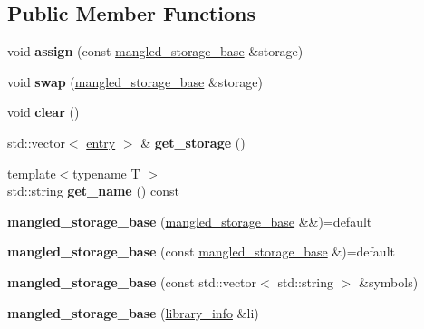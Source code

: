 \subsection*{Public Member Functions}
\begin{DoxyCompactItemize}
\item 
\mbox{\label{a01380_ac4989f636dfa95e4227246011e78c3cf}} 
void {\bfseries assign} (const \hyperlink{a01380}{mangled\+\_\+storage\+\_\+base} \&storage)
\item 
\mbox{\label{a01380_a70f98c02298a3beee142579612d5c3af}} 
void {\bfseries swap} (\hyperlink{a01380}{mangled\+\_\+storage\+\_\+base} \&storage)
\item 
\mbox{\label{a01380_a3bfdf5084f6b0bfcaf41c4d05d2fc7af}} 
void {\bfseries clear} ()
\item 
\mbox{\label{a01380_af90d143d8d8a55650fd50fba1d173cbf}} 
std\+::vector$<$ \hyperlink{a01384}{entry} $>$ \& {\bfseries get\+\_\+storage} ()
\item 
\mbox{\label{a01380_afcd7be4adc52c9699ca4dbe92cc5209f}} 
{\footnotesize template$<$typename T $>$ }\\std\+::string {\bfseries get\+\_\+name} () const
\item 
\mbox{\label{a01380_ac8061dc543e120d34db0915d8f257f1b}} 
{\bfseries mangled\+\_\+storage\+\_\+base} (\hyperlink{a01380}{mangled\+\_\+storage\+\_\+base} \&\&)=default
\item 
\mbox{\label{a01380_aa935845957cce3593df595b4928dcead}} 
{\bfseries mangled\+\_\+storage\+\_\+base} (const \hyperlink{a01380}{mangled\+\_\+storage\+\_\+base} \&)=default
\item 
\mbox{\label{a01380_a4210a0787c4174b60adee2501fe0d99e}} 
{\bfseries mangled\+\_\+storage\+\_\+base} (const std\+::vector$<$ std\+::string $>$ \&symbols)
\item 
\mbox{\label{a01380_ad487412b81fc7bbc06ebec993301dcca}} 
{\bfseries mangled\+\_\+storage\+\_\+base} (\hyperlink{a01704}{library\+\_\+info} \&li)
\item 
\mbox{\label{a01380_a90870b467978e20df37c2babfe0a3c13}} 

\end{DoxyCompactItemize}
